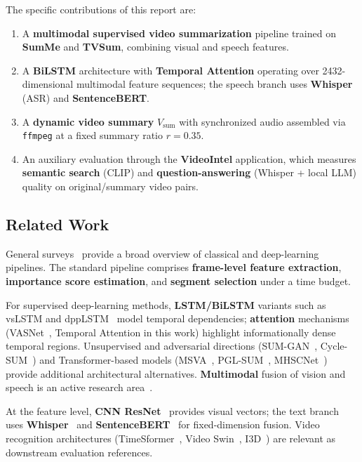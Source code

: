\documentclass[10pt,conference]{IEEEtran}
\begin{document}
The specific contributions of this report are:
\begin{enumerate}
  \item A \textbf{multimodal supervised video summarization} pipeline trained
        on \textbf{SumMe} and \textbf{TVSum}, combining visual and speech
        features.
  \item A \textbf{BiLSTM} architecture with \textbf{Temporal Attention}
        operating over 2432-dimensional multimodal feature sequences; the
        speech branch uses \textbf{Whisper} (ASR) and \textbf{SentenceBERT}.
  \item A \textbf{dynamic video summary} $V_{\mathrm{sum}}$ with synchronized
        audio assembled via \texttt{ffmpeg} at a fixed summary ratio
        $r = 0.35$.
  \item An auxiliary evaluation through the \textbf{VideoIntel} application,
        which measures \textbf{semantic search} (CLIP) and
        \textbf{question-answering} (Whisper + local LLM) quality on
        original/summary video pairs.
\end{enumerate}

\subsection{Related Work}

General surveys~\cite{haq2021,money2015,apostolidis2021survey,hu2023,kadam2022}
provide a broad overview of classical and deep-learning pipelines. The standard
pipeline comprises \textbf{frame-level feature extraction}, \textbf{importance
score estimation}, and \textbf{segment selection} under a time budget.

For supervised deep-learning methods, \textbf{LSTM/BiLSTM} variants such as
vsLSTM and dppLSTM~\cite{zhang2016lstm} model temporal dependencies;
\textbf{attention} mechanisms (VASNet~\cite{fajtl2018}, Temporal Attention in
this work) highlight informationally dense temporal regions. Unsupervised and
adversarial directions (SUM-GAN~\cite{mahasseni2017}, Cycle-SUM~\cite{zhang2019})
and Transformer-based models (MSVA~\cite{ghauri2021}, PGL-SUM~\cite{apostolidis2021pgl},
MHSCNet~\cite{zhu2022}) provide additional architectural alternatives.
\textbf{Multimodal} fusion of vision and speech is an active research
area~\cite{psallidas2021}.

At the feature level, \textbf{CNN ResNet}~\cite{he2016} provides visual
vectors; the text branch uses \textbf{Whisper}~\cite{radford2023whisper} and
\textbf{SentenceBERT}~\cite{reimers2019} for fixed-dimension fusion. Video
recognition architectures (TimeSformer~\cite{bertasius2021},
Video Swin~\cite{liu2022swin}, I3D~\cite{carreira2017}) are relevant as
downstream evaluation references.
\end{document}
